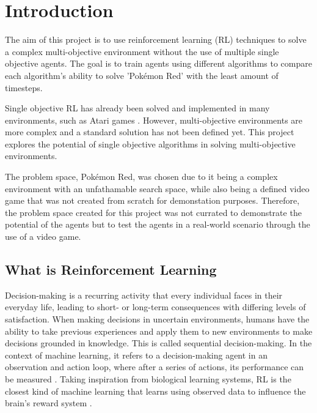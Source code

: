 \section{Introduction}

The aim of this project is to use reinforcement learning (RL) techniques to solve a complex multi-objective environment without the use of multiple single objective agents. The goal is to train agents using different algorithms to compare each algorithm's ability to solve 'Pokémon Red' with the least amount of timesteps. 

Single objective RL has already been solved and implemented in many environments, such as Atari games \cite{brockman2016openai}. However, multi-objective environments are more complex and a standard solution has not been defined yet. This project explores the potential of single objective algorithms in solving multi-objective environments.

The problem space, Pokémon Red, was chosen due to it being a complex environment with an unfathamable search space, while also being a defined video game that was not created from scratch for demonstation purposes. Therefore, the problem space created for this project was not currated to demonstrate the potential of the agents but to test the agents in a real-world scenario through the use of a video game.

\subsection{What is Reinforcement Learning}

Decision-making is a recurring activity that every individual faces in their everyday life, leading to short- or long-term consequences with differing levels of satisfaction. When making decisions in uncertain environments, humans have the ability to take previous experiences and apply them to new environments to make decisions grounded in knowledge. This is called sequential decision-making. In the context of machine learning, it refers to a decision-making agent in an observation and action loop, where after a series of actions, its performance can be measured \cite{francon2020effective}. Taking inspiration from biological learning systems, RL is the closest kind of machine learning that learns using observed data to influence the brain's reward system \cite{Sutton1}. 

